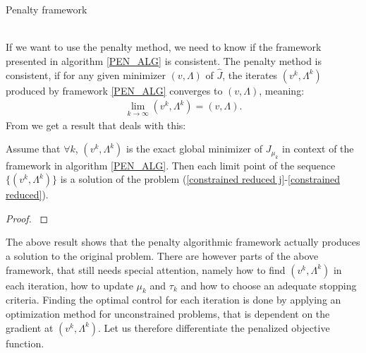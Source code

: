 \\
\\
\begin{algorithm}[H] 
\caption{Penalty framework\label{PEN_ALG}}
\end{algorithm}
\noindent
\\
If we want to use the penalty method, we need to know if the framework presented in algorithm \ref{PEN_ALG} is consistent. The penalty method is consistent, if for any given minimizer $(v,\Lambda)$ of $\hat J$, the iterates $(v^k,\Lambda^k)$ produced by framework \ref{PEN_ALG} converges to $(v,\Lambda)$, meaning:
\begin{align*}
\lim_{k\rightarrow \infty} (v^k,\Lambda^k) =(v,\Lambda).
\end{align*}
From \cite{nocedal2006numerical} we get a result that deals with this:
\begin{theorem}
Assume that $\forall k$, $(v^k,\Lambda^k)$ is the exact global minimizer of $J_{\mu_k}$ in context of the framework in algorithm \ref{PEN_ALG}. Then each limit point of the sequence $\{(v^k,\Lambda^k)\}$ is a solution of the problem (\ref{constrained reduced j}-\ref{constrained reduced}).
\end{theorem}
\begin{proof}
\cite{nocedal2006numerical}
\end{proof}
\noindent
The above result shows that the penalty algorithmic framework actually produces a solution to the original problem. There are however parts of the above framework, that still needs special attention, namely how to find $(v^k,\Lambda^k)$ in each iteration, how to update $\mu_k$ and $\tau_k$ and how to choose an adequate stopping criteria. Finding the optimal control for each iteration is done by applying an optimization method for unconstrained problems, that is dependent on the gradient at $(v^k,\Lambda^k)$. Let us therefore differentiate the penalized objective function.
